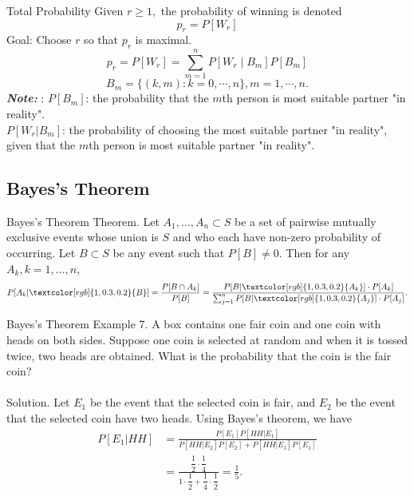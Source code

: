 \documentclass[hyperref={pdfpagelabels=false}]{beamer}
\newcommand{\highlightr}[1]{\textcolor[rgb]{1,0.3,0.2}{\emph{\textbf{#1}}}}
\newcommand{\structb}[1]{\textcolor[rgb]{0.2,0.2,0.7}{#1}}
\newcommand{\red}[1]{\textcolor[rgb]{1,0.3,0.2}{#1}}
\begin{document}
%
\begin{frame}{Total Probability}
    \justifying
    Given $r \geq 1,$ the probability of winning is denoted
    $$
        p_{r}=P\left[W_{r}\right]
    $$
    \structb{Goal: }Choose $r$ so that $p_{r}$ is maximal.
    ~\\
    $$
        p_{r}=P\left[W_{r}\right]=\sum_{m=1}^{n} P\left[W_{r} \mid B_{m}\right] P\left[B_{m}\right]
    $$
    $$
        B_m = \{(k, m): k = 0, \cdots, n\}, m = 1, \cdots, n.
    $$
    \highlightr{Note: }: $P\left[B_{m}\right]$: the probability that the $m$th person is most suitable partner "in reality".
    ~\\
    $P\left[W_{r} | B_{m}\right]$: the probability of choosing the most suitable partner "in reality", given that the $m$th person is most suitable partner "in reality".
\end{frame}

%
\subsection{Bayes's Theorem}
%
\begin{frame}{Bayes's Theorem}
    \justifying
    \structb{Theorem.} Let $A_1, \ldots, A_n \subset S$ be a set of pairwise mutually exclusive events whose union is $S$ and who each have non-zero probability of occurring. Let $B\subset S$ be any event such that $P[B]\neq 0$. Then for any $A_k, k = 1, \ldots, n$,
    \begin{align*}
        P[A_k|\red{B}] = \frac{P[B\cap A_k]}{P[B]} = \frac{P[B|\red{A_k}]\cdot P[A_k]}{\sum_{j=1}^n P[B|\red{A_j}] \cdot P[A_j]}.
    \end{align*}
\end{frame}
%
\begin{frame}{Bayes's Theorem}
    \justifying
    \structb{Example 7.} A box contains one fair coin and one coin with heads on both sides. Suppose one coin is selected at random and when it is tossed twice, two heads are obtained. What is the probability that the coin is the fair coin?
    ~\\
    ~\\
    \pause
    \justifying
    \structb{Solution.} Let $E_1$ be the event that the selected coin is fair, and $E_2$ be the event that the selected coin have two heads. Using Bayes's theorem, we have
    \begin{align*}
        P[E_1|HH] & = \frac{P[E_1]P[HH|E_1]}{P[HH|E_2]P[E_2] + P[HH|E_1]P[E_1]} \\
        & = \frac{\dfrac{1}{2}\cdot \dfrac{1}{4}}{1\cdot \dfrac{1}{2} + \dfrac{1}{4}\cdot\dfrac{1}{2}} = \frac{1}{5}.
    \end{align*}
\end{frame}
%
\end{document}
